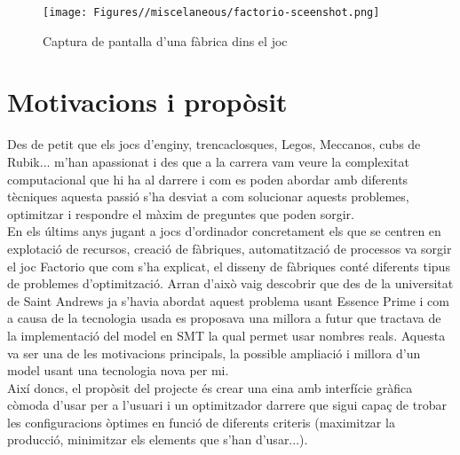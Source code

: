 \begin{figure}
    \centering
    \texttt{[image: Figures//miscelaneous/factorio-sceenshot.png]}
    \caption{Captura de pantalla d'una fàbrica dins el joc}
    \label{fig:game-sceenshot}
\end{figure}

\section{Motivacions i propòsit}
Des de petit que els jocs d'enginy, trencaclosques, Legos, Meccanos, cubs de Rubik... m'han apassionat i des que a la carrera vam veure la complexitat computacional que hi ha al darrere i com es poden abordar amb diferents tècniques aquesta passió s'ha desviat a com solucionar aquests problemes, optimitzar i respondre el màxim de preguntes que poden sorgir.\\

En els últims anys jugant a jocs d'ordinador concretament els que se centren en explotació de recursos, creació de fàbriques, automatització de processos va sorgir el joc Factorio que com s'ha explicat, el disseny de fàbriques conté diferents tipus de problemes d'optimització. Arran d'això vaig descobrir que des de la universitat de Saint Andrews ja s'havia abordat aquest problema usant Essence Prime i com a causa de la tecnologia usada es proposava una millora a futur que tractava de la implementació del model en SMT la qual permet usar nombres reals. Aquesta va ser una de les motivacions principals, la possible ampliació i millora d'un model usant una tecnologia nova per mi.\\

Així doncs, el propòsit del projecte és crear una eina amb interfície gràfica còmoda d'usar per a l'usuari i un optimitzador darrere que sigui capaç de trobar les configuracions òptimes en funció de diferents criteris (maximitzar la producció, minimitzar els elements que s'han d'usar...).

